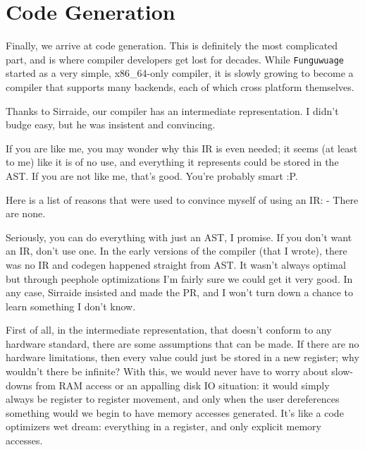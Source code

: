 \documentclass[12pt]{report}
\newcommand{\langname}{Funguwuage}
\newcommand{\lang}{\texttt{\langname} }
\begin{document}
\chapter{Code Generation}
\label{ch:codegen}

Finally, we arrive at code generation. This is definitely the most complicated part, and is where compiler developers get lost for decades. While \lang started as a very simple, x86\_64-only compiler, it is slowly growing to become a compiler that supports many backends, each of which cross platform themselves.

Thanks to Sirraide, our compiler has an intermediate representation. I didn't budge easy, but he was insistent and convincing.

If you are like me, you may wonder why this IR is even needed; it seems (at least to me) like it is of no use, and everything it represents could be stored in the AST. If you are not like me, that's good. You're probably smart :P.

Here is a list of reasons that were used to convince myself of using an IR:
- There are none.

Seriously, you can do everything with just an AST, I promise. If you don't want an IR, don't use one. In the early versions of the compiler (that I wrote), there was no IR and codegen happened straight from AST. It wasn't always optimal but through peephole optimizations I'm fairly sure we could get it very good. In any case, Sirraide insisted and made the PR, and I won't turn down a chance to learn something I don't know.

First of all, in the intermediate representation, that doesn't conform to any hardware standard, there are some assumptions that can be made. If there are no hardware limitations, then every value could just be stored in a new register; why wouldn't there be infinite? With this, we would never have to worry about slow-downs from RAM access or an appalling disk IO situation: it would simply always be register to register movement, and only when the user dereferences something would we begin to have memory accesses generated. It's like a code optimizers wet dream: everything in a register, and only explicit memory accesses.

\end{document}
